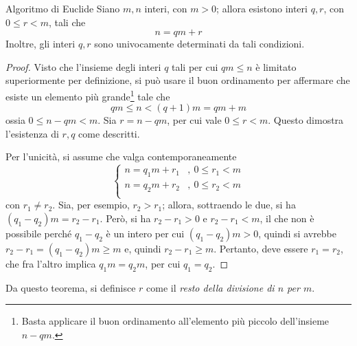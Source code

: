 \documentclass[11pt, a4paper]{scrartcl}
\theoremstyle{definition}
\numberwithin{esempio}{section}
\theoremstyle{definition}
\numberwithin{obs}{section}
\numberwithin{nota}{section}
\numberwithin{equation}{subsection}
\begin{document}
\begin{teorema}
	{Algoritmo di Euclide}{}
	Siano $m,n$ interi, con $m>0$; allora esistono interi $q,r$, con $0\le r< m$, tali che
	\begin{equation}
		n = qm  + r
	\end{equation}
	Inoltre, gli interi $q,r$ sono univocamente determinati da tali condizioni.
	\begin{proof}
		Visto che l'insieme degli interi $q$ tali per cui $qm\le n$ \`e limitato superiormente per definizione, si pu\`o usare il buon ordinamento per affermare che esiste un elemento pi\`u grande\footnote{Basta applicare il buon ordinamento all'elemento pi\`u piccolo dell'insieme $n-qm$.} tale che
		\[
		qm \le n < (q+1) m = q m + m
		\] 
		ossia $0\le n - qm < m$. Sia $r = n - qm$, per cui vale $0\le r < m$. Questo dimostra l'esistenza di $r,q$ come descritti.

		Per l'unicit\`a, si assume che valga contemporaneamente
		\[
		\begin{cases}
			n = q_1m + r_1&, \ 0\le r_1<m\\
			n = q_2m + r_2&, \ 0\le r_2<m\\
		\end{cases}
		\] 
		con $r_1 \neq r_2$. Sia, per esempio, $r_2> r_1$; allora, sottraendo le due, si ha $(q_1-q_2) m = r_2-r_1$. 
		Per\`o, si ha $r_2-r_1> 0$ e $r_2-r_1 < m$, il che non \`e possibile perch\'e $q_1-q_2$ \`e un intero per cui $(q_1 - q_2)m > 0$, quindi si avrebbe $r_2-r_1 = (q_1-q_2)m \ge m$ e, quindi $r_2-r_1\ge m$.
		Pertanto, deve essere $r_1=r_2$, che fra l'altro implica $q_1m=q_2m$, per cui $q_1=q_2$.
	\end{proof}
\end{teorema}
\noindent Da questo teorema, si definisce $r$ come il \textit{resto della divisione di $n$ per $m$}.
\end{document}
